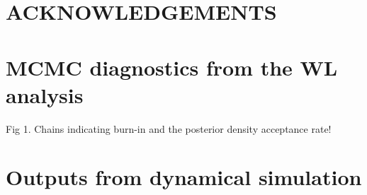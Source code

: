 \documentclass[letterpaper,useAMS,usenatbib]{mn2e}
\begin{document}
\section{ACKNOWLEDGEMENTS}



\appendix
\section{MCMC diagnostics from the WL analysis}
Fig 1. Chains indicating burn-in and the posterior density 
acceptance rate!


\section{Outputs from dynamical simulation}
\clearpage\bsp\label{lastpage} 
\end{document}
